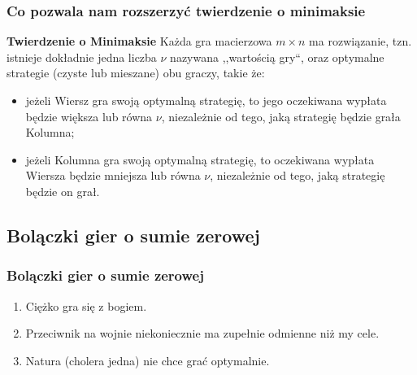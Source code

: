 \documentclass[8pt, brown]{beamer}
\begin{document}
		\begin{frame}
			\frametitle{Co pozwala nam rozszerzyć twierdzenie o minimaksie}
			\begin{block}{\textbf{Twierdzenie o Minimaksie}}
				Każda gra macierzowa $m \times n$ ma rozwiązanie, tzn. istnieje dokładnie jedna liczba $\nu$ nazywana ,,wartością gry``, oraz optymalne strategie (czyste lub mieszane) obu graczy, takie że:
				\begin{itemize}
				 \item jeżeli Wiersz gra swoją optymalną strategię, to jego oczekiwana wypłata będzie większa lub równa $\nu$, niezależnie od tego, jaką strategię będzie grała Kolumna;
				 \item jeżeli Kolumna gra swoją optymalną strategię, to oczekiwana wypłata Wiersza będzie mniejsza lub równa $\nu$, niezależnie od tego, jaką strategię będzie on grał.
				\end{itemize}

			\end{block}
		\end{frame}
		

		\subsection{Bolączki gier o sumie zerowej}
		\begin{frame}
			\frametitle{Bolączki gier o sumie zerowej}
			\begin{enumerate}
				\item Ciężko gra się z bogiem.
				\item Przeciwnik na wojnie niekoniecznie ma zupełnie odmienne niż my cele.
				\item Natura (cholera jedna) nie chce grać optymalnie.
			\end{enumerate}	
		\end{frame}
\end{document}
